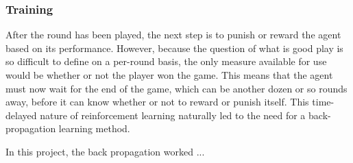 
\subsubsection{Training}




After the round has been played,
the next step is to punish or reward the agent based on its performance.
%
However,
because the question of what is good play is so difficult to define on a
per-round basis,
the only measure available for use would be whether or not the player won the
game.
%
This means that the agent must now wait for the end of the game,
which can be another dozen or so rounds away,
before it can know whether or not to reward or punish itself.
%
This time-delayed nature of reinforcement learning naturally led to the need for
a back-propagation learning method.

In this project, the back propagation worked ...

